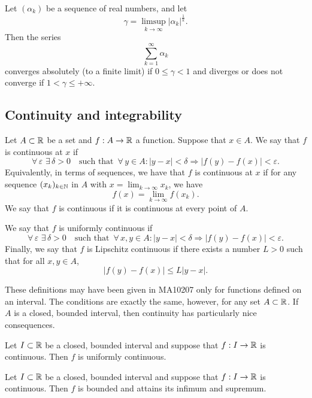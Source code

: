 \bigskip


\begin{theorem}
Let $(\alpha_k)$ be a sequence of real numbers, and let
$$
\gamma = \limsup_{k\to \infty}\left|\alpha_k\right|^{\frac1k}.
$$
Then the series 
$$
\sum_{k=1}^\infty \alpha_k
$$
converges absolutely (to a finite limit) if $0\leq \gamma<1$ and diverges or does not converge if $1<\gamma\leq +\infty$.
\end{theorem}






\subsection{Continuity and integrability}

\begin{definition} Let $A\subset \mathbb{R}$ be a set and $f : A \to \mathbb{R}$ a function. Suppose that $x \in A$. We say that $f$ is continuous at $x$ if
$$
\forall\, \varepsilon \,\, \exists\, \delta>0 \quad \textrm{such that } \, \forall \, y\in A:  |y - x| < \delta \Rightarrow |f (y) - f (x)| < \varepsilon.
$$
Equivalently, in terms of sequences, we have that $f$ is continuous at $x$ if for any sequence $(x_k)_{k\in \mathbb{N}}$ in $A$ with $x=\lim_{k\to \infty} x_k$, we have  
$$
f(x)=\lim_{k\to \infty} f(x_k).
$$
We say that $f$ is continuous if it is continuous at every point of $A$. 

We say that $f$ is uniformly continuous if
$$
\forall\, \varepsilon \,\, \exists\, \delta>0 \quad \textrm{such that } \, \forall \, x, y\in A:  |y - x| < \delta \Rightarrow |f (y) - f (x)| < \varepsilon.
$$
Finally, we say that $f$ is Lipschitz continuous if there exists a number $L > 0$ such that for all $x,y \in A$,
$$
|f(y) - f(x)| \le L |y - x|.
$$
\end{definition}

These definitions may have been given in MA10207 only for functions defined on an interval. The conditions are exactly the same, however, for any set $A\subset \mathbb{R}$. If $A$ is a closed, bounded interval, then continuity has particularly nice consequences.

\begin{theorem} 
Let $I \subset \mathbb{R}$ be a closed, bounded interval and suppose that $f : I \to \mathbb{R}$ is continuous. Then $f$ is uniformly continuous.
\end{theorem}

\begin{theorem}
Let $I \subset \mathbb{R}$ be a closed, bounded interval and suppose that $f : I \to \mathbb{R}$ is continuous. Then $f$ is bounded and attains its infimum and supremum.
\end{theorem}

